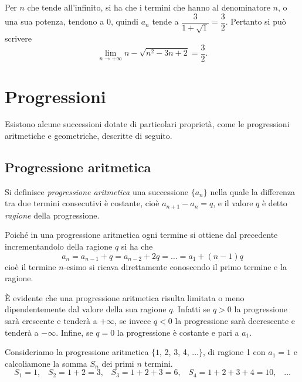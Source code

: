 \begin{exrig}
\begin{esempio}
Per $n$ che tende all'infinito, si ha che i termini che hanno al denominatore $n$, o una sua potenza, tendono a 0, quindi $a_n$ tende a $\dfrac{3}{1+\sqrt{1}} = \dfrac{3}{2}$. Pertanto si può scrivere
\[\lim_{n\to+\infty} n-\sqrt{n^2-3n+2} = \frac{3}{2}.\]
\end{esempio}

\end{exrig}
\vspazio\ovalbox{\risolvii \ref{ese:8a_lsucc.1}, \ref{ese:8a_lsucc.2}, \ref{ese:8a_lsucc.3}, \ref{ese:8a_lsucc.4}, \ref{ese:8a_lsucc.5}, \ref{ese:8a_lsucc.6}, \ref{ese:8a_lsucc.7}}


\section{Progressioni}

Esistono alcune successioni dotate di particolari proprietà, come le progressioni aritmetiche e geometriche, descritte di seguito.

\subsection{Progressione aritmetica}

\begin{definizione}
Si definisce \emph{progressione aritmetica} una successione $\{a_n\}$ nella quale la differenza tra due termini consecutivi è costante, cioè $a_{n+1} - a_n = q$, e il valore $q$ è detto \emph{ragione} della progressione.
\end{definizione}

Poiché in una progressione aritmetica ogni termine si ottiene dal precedente incrementandolo della ragione $q$ si ha che
\[a_n = a_{n-1}+q = a_{n-2}+2q = \ldots = a_1 + (n-1)q\]
cioè il termine $n$-esimo si ricava direttamente conoscendo il primo termine e la ragione.

\`E evidente che una progressione aritmetica risulta limitata o meno dipendentemente dal valore della sua ragione $q$. Infatti se $q>0$ la progressione sarà crescente e tenderà a $+\infty$, se invece $q<0$ la progressione sarà decrescente e tenderà a $-\infty$. Infine, se $q=0$ la progressione è costante e pari a $a_1$.

Consideriamo la progressione aritmetica $\{1$, 2, 3, 4, $\ldots\}$, di ragione 1 con $a_1=1$ e calcoliamone la somma $S_n$ dei primi $n$ termini.
\[S_1=1\text{,}\quad S_2=1+2=3\text{,}\quad S_3=1+2+3=6\text{,}
\quad S_4=1+2+3+4=10\text{,}\quad\ldots\]

